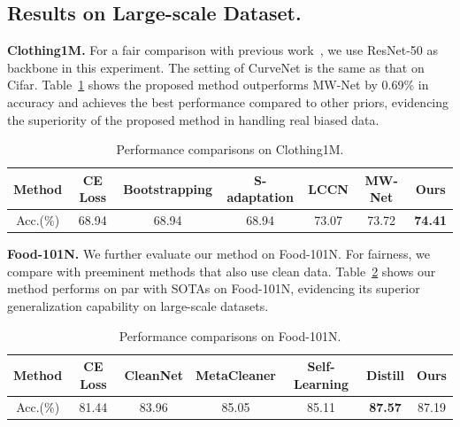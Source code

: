 \documentclass[letterpaper]{article} %
\newcommand{\bd}[1]{\textbf{#1}}
\begin{document}
\subsection{Results on Large-scale Dataset.}
\noindent\bd{Clothing1M.}
For a fair comparison with previous work~\cite{shu2019meta}, we use ResNet-50 as backbone in this experiment.
The setting of CurveNet is the same as that on Cifar.
Table~\ref{tab:clothing} shows the proposed method outperforms MW-Net by 0.69\% in accuracy and achieves the best performance compared to other priors, evidencing the superiority of the proposed method in handling real biased data.

\begin{table}[h]
  \centering
  \begin{adjustbox}{max width=0.47\textwidth}
    \begin{tabular}{c|cccccc}
    \toprule
    Method & CE Loss & Bootstrapping & S-adaptation & LCCN & MW-Net & Ours \\
    \midrule
    Acc.(\%)  & 68.94 & 68.94 & 68.94 & 73.07 & 73.72 & \bd{74.41} \\
    \bottomrule
    \end{tabular}%
    \end{adjustbox}
    \caption{Performance comparisons on Clothing1M.}
    \label{tab:clothing}
\end{table}%

\noindent\bd{Food-101N.}
We further evaluate our method on Food-101N.
For fairness, we compare with preeminent methods that also use clean data. Table~\ref{tab:food101} shows our method performs on par with SOTAs on Food-101N, evidencing its superior generalization capability on large-scale datasets.
\begin{table}[h]
  \centering
  \begin{adjustbox}{max width=0.47\textwidth}
    \begin{tabular}{c|cccccc}
    \toprule
    Method & CE Loss & CleanNet & MetaCleaner & Self-Learning & Distill & Ours \\
    \midrule
    Acc.(\%)  & 81.44 & 83.96 & 85.05 & 85.11 & \bd{87.57} & 87.19 \\
    \bottomrule
    \end{tabular}%
    \end{adjustbox}
    \caption{Performance comparisons on Food-101N.}
  \label{tab:food101}%
\end{table}%
\end{document}
